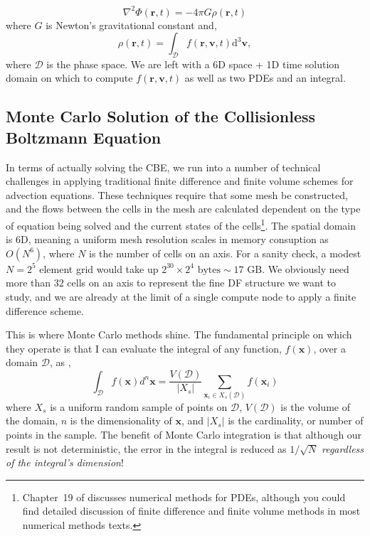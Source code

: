 \begin{equation}
\nabla^2 \Phi(\textbf{r},t) = -4 \pi G \rho(\textbf{r},t) \label{eq:poisson}
\end{equation} 
where $G$ is Newton's gravitational constant and,
\begin{equation}
\rho(\textbf{r},t) = \int_{\mathcal{D}} f(\textbf{r}, \textbf{v}, t) \text{d}^3 \textbf{v},
\end{equation}
where $\mathcal{D}$ is the phase space. We are left with a 6D space + 1D time solution domain on which to compute $f(\textbf{r},\textbf{v},t)$ as well as two PDEs and an integral.

\subsection{Monte Carlo Solution of the Collisionless Boltzmann Equation}

In terms of actually solving the CBE, we run into a number of technical challenges in applying traditional finite difference and finite volume schemes for advection equations. These techniques require that some mesh be constructed, and the flows between the cells in the mesh are calculated dependent on the type of equation being solved and the current states of the cells\footnote{Chapter~19 of \citet{numerical_recipes_fortran} discusses numerical methods for PDEs, although you could find detailed discussion of finite difference and finite volume methods in most numerical methods texts.}. The spatial domain is 6D, meaning a uniform mesh resolution scales in memory consuption as $O(N^6)$, where $N$ is the number of cells on an axis. For a sanity check, a modest $N = 2^5$ element grid would take up $2^{30} \times 2^4 \text{ bytes} \sim 17 \text{ GB}$. We obviously need more than 32 cells on an axis to represent the fine DF structure we want to study, and we are already at the limit of a single compute node to apply a finite difference scheme. 

This is where Monte Carlo methods shine. The fundamental principle on which they operate is that I can evaluate the integral of any function, $f(\textbf{x})$, over a domain $\mathcal{D}$, as \citep{numerical_recipes_fortran},
\begin{equation}
\int_\mathcal{D} f(\textbf{x}) d^{n} \textbf{x} = \frac{V(\mathcal{D})}{\vert X_s \vert} \sum_{\textbf{x}_i \in X_s(\mathcal{D})} f(\textbf{x}_i)
\end{equation}
where $X_s$ is a uniform random sample of points on $\mathcal{D}$, $V(\mathcal{D})$ is the volume of the domain, $n$ is the dimensionality of $\textbf{x}$, and $\vert X_s \vert$ is the cardinality, or number of points in the sample. The benefit of Monte Carlo integration is that although our result is not deterministic, the error in the integral is reduced as $1/\sqrt{N}$ \textit{regardless of the integral's dimension}! 

